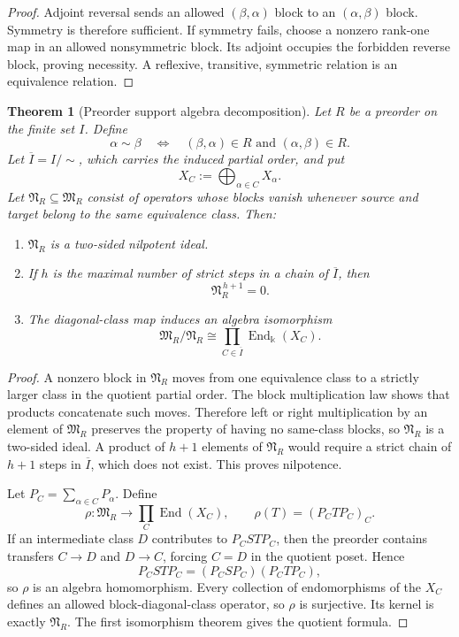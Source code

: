 \documentclass[11pt]{article}
\newtheorem{theorem}{Theorem}[section]
\theoremstyle{definition}
\theoremstyle{remark}
\theoremstyle{definition}\newtheorem{example}[theorem]{Example}
\newcommand{\bbk}{\Bbbk}
\newcommand{\End}{\operatorname{End}}
\newcommand{\RecordID}[1]{\label{record:#1}}
\newcommand{\Depends}[1]{}
\newcommand{\Exports}[1]{}
\begin{document}
\begin{proof}
Adjoint reversal sends an allowed $(\beta,\alpha)$ block to an $(\alpha,\beta)$ block.  Symmetry is therefore sufficient.  If symmetry fails, choose a nonzero rank-one map in an allowed nonsymmetric block.  Its adjoint occupies the forbidden reverse block, proving necessity.  A reflexive, transitive, symmetric relation is an equivalence relation.
\end{proof}

\begin{theorem}[Preorder support algebra decomposition]
\label{thm:preorder-decomposition}
Let $R$ be a preorder on the finite set $I$.  Define
\[
\alpha\sim\beta
\quad\Longleftrightarrow\quad
(\beta,\alpha)\in R\text{ and }(\alpha,\beta)\in R.
\]
Let $\overline I=I/{\sim}$, which carries the induced partial order, and put
\[
X_C:=\bigoplus_{\alpha\in C}X_\alpha.
\]
Let $\mathfrak N_R\subseteq\mathfrak M_R$ consist of operators whose blocks vanish whenever source and target belong to the same equivalence class.  Then:
\begin{enumerate}[label=(\roman*)]
\item $\mathfrak N_R$ is a two-sided nilpotent ideal.
\item If $h$ is the maximal number of strict steps in a chain of $\overline I$, then
\[
\mathfrak N_R^{\,h+1}=0.
\]
\item The diagonal-class map induces an algebra isomorphism
\[
\boxed{
\mathfrak M_R/\mathfrak N_R
\cong
\prod_{C\in\overline I}\End_{\bbk}(X_C).
}
\]
\end{enumerate}
\end{theorem}
\RecordID{PSC-I-T-PREORDER-ALGEBRA-DECOMPOSITION}
\Depends{PSC-I-T-BLOCK-MULTIPLICATION and PSC-I-T-SUPPORT-PATTERN-ALGEBRA.}
\Exports{Filtered transfer algebras and triangular packet inverses in Paper II.}

\begin{proof}
A nonzero block in $\mathfrak N_R$ moves from one equivalence class to a strictly larger class in the quotient partial order.  The block multiplication law shows that products concatenate such moves.  Therefore left or right multiplication by an element of $\mathfrak M_R$ preserves the property of having no same-class blocks, so $\mathfrak N_R$ is a two-sided ideal.  A product of $h+1$ elements of $\mathfrak N_R$ would require a strict chain of $h+1$ steps in $\overline I$, which does not exist.  This proves nilpotence.

Let $P_C=\sum_{\alpha\in C}P_\alpha$.  Define
\[
\rho:\mathfrak M_R\longrightarrow\prod_C\End(X_C),
\qquad
\rho(T)=(P_CTP_C)_C.
\]
If an intermediate class $D$ contributes to $P_CSTP_C$, then the preorder contains transfers $C\to D$ and $D\to C$, forcing $C=D$ in the quotient poset.  Hence
\[
P_CSTP_C=(P_CSP_C)(P_CTP_C),
\]
so $\rho$ is an algebra homomorphism.  Every collection of endomorphisms of the $X_C$ defines an allowed block-diagonal-class operator, so $\rho$ is surjective.  Its kernel is exactly $\mathfrak N_R$.  The first isomorphism theorem gives the quotient formula.
\end{proof}
\end{document}
